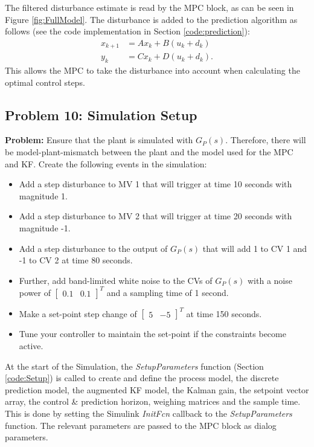 \documentclass[12pt]{article}
\begin{document}
The filtered disturbance estimate is read by the MPC block, as can be seen in Figure \ref{fig:FullModel}. The disturbance is added to the prediction algorithm as follows (see the code implementation in Section \ref{code:prediction}):
\begin{subequations}
\begin{align}
x_{k+1} &= Ax_k + B(u_k+d_k) \\
y_k &= Cx_k + D(u_k+d_k).
\end{align} \label{eq:PredModelWithDisturbance}
\end{subequations}
This allows the MPC to take the disturbance into account when calculating the optimal control steps.

\subsection{Problem 10: Simulation Setup}

\textbf{Problem:} Ensure that the plant is simulated with $G_P(s)$. Therefore, there will be model-plant-mismatch between the plant and the model used for the MPC and KF. Create the following events in the simulation: 
\begin{itemize}
	\itemsep0em
	\item Add a step disturbance to MV 1 that will trigger at time 10 seconds with magnitude 1.
	\item Add a step disturbance to MV 2 that will trigger at time 20 seconds with magnitude -1.
	\item Add a step disturbance to the output of $G_P(s)$ that will add 1 to CV 1 and -1 to CV 2 at	time 80 seconds.
	\item Further, add band-limited white noise to the CVs of $G_P(s)$ with a noise power of $\begin{bmatrix} 0.1 & 0.1 \end{bmatrix}^T$ and a sampling time of 1 second.
	\item Make a set-point step change of $\begin{bmatrix} 5 & -5 \end{bmatrix}^T$ at time 150 seconds.
	\item Tune your controller to maintain the set-point if the constraints become active.
\end{itemize}

At the start of the Simulation, the \textit{SetupParameters} function (Section \ref{code:Setup}) is called to create and define the process model, the discrete prediction model, the augmented KF model, the Kalman gain, the setpoint vector array, the control \& prediction horizon, weighing matrices and the sample time. This is done by setting the Simulink \textit{InitFcn} callback to the \textit{SetupParameters} function. The relevant parameters are passed to the MPC block as dialog parameters.
\end{document}
